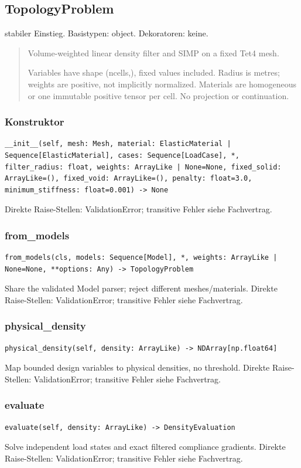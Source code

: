 \subsection{TopologyProblem}
stabiler Einstieg.
Basistypen: object. Dekoratoren: keine.
\begin{quote}
Volume-weighted linear density filter and SIMP on a fixed Tet4 mesh.\par Variables have shape (ncells,), fixed values included. Radius is metres; weights are positive, not implicitly normalized. Materials are homogeneous or one immutable positive tensor per cell. No projection or continuation.
\end{quote}
\subsubsection*{Konstruktor}
\begin{lstlisting}
__init__(self, mesh: Mesh, material: ElasticMaterial | Sequence[ElasticMaterial], cases: Sequence[LoadCase], *, filter_radius: float, weights: ArrayLike | None=None, fixed_solid: ArrayLike=(), fixed_void: ArrayLike=(), penalty: float=3.0, minimum_stiffness: float=0.001) -> None
\end{lstlisting}
Direkte Raise-Stellen: ValidationError; transitive Fehler siehe Fachvertrag.
\subsubsection*{from\_models}
\begin{lstlisting}
from_models(cls, models: Sequence[Model], *, weights: ArrayLike | None=None, **options: Any) -> TopologyProblem
\end{lstlisting}
Share the validated Model parser; reject different meshes/materials.
Direkte Raise-Stellen: ValidationError; transitive Fehler siehe Fachvertrag.
\subsubsection*{physical\_density}
\begin{lstlisting}
physical_density(self, density: ArrayLike) -> NDArray[np.float64]
\end{lstlisting}
Map bounded design variables to physical densities, no threshold.
Direkte Raise-Stellen: ValidationError; transitive Fehler siehe Fachvertrag.
\subsubsection*{evaluate}
\begin{lstlisting}
evaluate(self, density: ArrayLike) -> DensityEvaluation
\end{lstlisting}
Solve independent load states and exact filtered compliance gradients.
Direkte Raise-Stellen: ValidationError; transitive Fehler siehe Fachvertrag.
